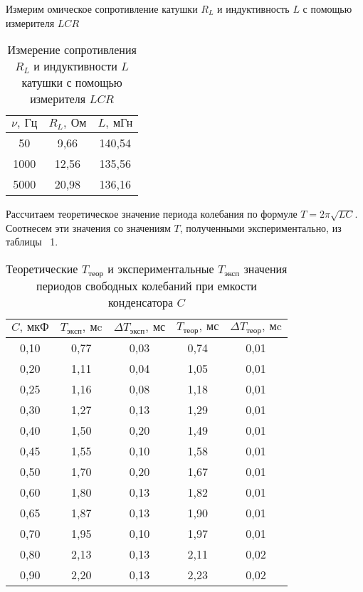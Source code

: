 Измерим омическое сопротивление катушки
$R_L$ и индуктивность $L$ с помощью
измерителя $LCR$ 
\begin{table}[H]
\begin{tabular}{|c|c|c|}
\hline
$\nu, \ \text{Гц}$   & $R_L, \
\text{Ом}$    & $L, \ \text{мГн}$      \\ \hline
50   & 9,66  & 140,54 \\ \hline
1000 & 12,56 & 135,56 \\ \hline
5000 & 20,98 & 136,16 \\ \hline
\end{tabular}
\captionsetup{justification=centering}
\caption{Измерение сопротивления $R_L$
и индуктивности $L$ катушки с помощью
измерителя $LCR$}
\end{table}

Рассчитаем теоретическое значение
периода колебания по формуле $T =
2\pi\sqrt{LC}$. Соотнесем эти значения
со значениям $T$, полученными
экспериментально, из таблицы ~1.
\begin{table}[H]
\begin{tabular}{|c|c|c|c|c|}
\hline
$C, \ \text{мкФ}$ & $T_\text{эксп}, \
\text{мc} $   & $\Delta
T_\text{эксп}, \ \text{мс}$   &
$T_\text{теор}, \ \text{мс}$    &
$\Delta T_\text{теор}, \ \text{мc}$   \\ \hline
0,10  & 0,77 & 0,03 & 0,74 & 0,01 \\ \hline
0,20  & 1,11 & 0,04 & 1,05 & 0,01 \\ \hline
0,25 & 1,16 & 0,08 & 1,18 & 0,01 \\ \hline
0,30  & 1,27 & 0,13 & 1,29 & 0,01 \\ \hline
0,40  & 1,50 & 0,20 & 1,49 & 0,01 \\ \hline
0,45 & 1,55 & 0,10 & 1,58 & 0,01 \\ \hline
0,50  & 1,70 & 0,20 & 1,67 & 0,01 \\ \hline
0,60  & 1,80 & 0,13 & 1,82 & 0,01 \\ \hline
0,65 & 1,87 & 0,13 & 1,90 & 0,01 \\ \hline
0,70  & 1,95 & 0,10 & 1,97 & 0,01 \\ \hline
0,80  & 2,13 & 0,13 & 2,11 & 0,02 \\ \hline
0,90  & 2,20 & 0,13 & 2,23 & 0,02 \\ \hline\end{tabular}
\captionsetup{justification=centering}
\caption{Теоретические $T_\text{теор}$ и экспериментальные
$T_\text{эксп}$ значения периодов
свободных колебаний при емкости
конденсатора  $C$ }
\end{table}

